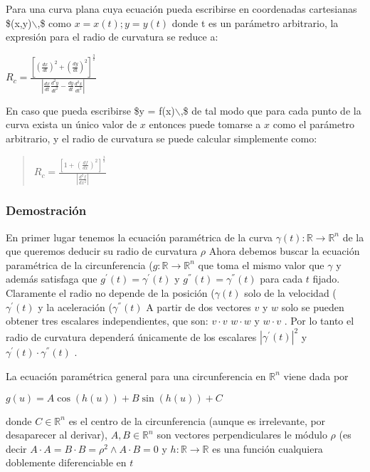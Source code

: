 \documentclass[11pt]{article}
\begin{document}
Para una curva plana cuya ecuación pueda escribirse en coordenadas
cartesianas
\$(x,y)$\backslash$,\$
como
\(x = x(t);y = y(t)\)
donde t es un parámetro arbitrario, la expresión para el radio de
curvatura se reduce a:

\(R_{c} = \frac{\left\lbrack {\left( \frac{dx}{dt} \right)^{2} + \left( \frac{dy}{dt} \right)^{2}} \right\rbrack^{\frac{3}{2}}}{\left| {\frac{dx}{dt}\frac{d^{2}y}{dt^{2}} - \frac{dy}{dt}\frac{d^{2}x}{dt^{2}}} \right|}\)

En caso que pueda escribirse
\$y = f(x)$\backslash$,\$
de tal modo que para cada punto de la curva exista un único valor de
\(x\)
entonces puede tomarse a
\(x\)
como el parámetro arbitrario, y el radio de curvatura se puede calcular
simplemente como:

\begin{quote}
\(R_{c} = \frac{\left\lbrack {1 + \left( \frac{df}{dx} \right)^{2}} \right\rbrack^{\frac{3}{2}}}{\left| \frac{d^{2}f}{dx^{2}} \right|}\)
\end{quote}

\subsubsection{Demostración}
\label{sec:org87e035a}

En primer lugar tenemos la ecuación paramétrica de la curva
\(\gamma(t):\mathbb{R}\rightarrow\mathbb{R}^{n}\)
de la que queremos deducir su radio de curvatura
\(\rho\)
Ahora debemos buscar la ecuación paramétrica de la circunferencia
(\(g:\mathbb{R}\rightarrow\mathbb{R}^{n}\)
que toma el mismo valor que
\(\gamma\)
y además satisfaga que
\(g^{\prime}(t) = \gamma^{\prime}(t)\)
y
\(g^{''}(t) = \gamma^{''}(t)\)
para cada
\(t\)
fijado. Claramente el radio no depende de la posición
(\(\gamma(t)\)
solo de la velocidad
(\(\gamma^{\prime}(t)\)
y la aceleración
(\(\gamma^{''}(t)\)
A partir de dos vectores
\(v\)
y
\(w\)
solo se pueden obtener tres escalares independientes, que son:
\(v \cdot v\)
\(w \cdot w\)
y
\(w \cdot v\)
. Por lo tanto el radio de curvatura dependerá únicamente de los
escalares
\(|\gamma^{\prime}(t)|^{2}\)
y
\(\gamma^{\prime}(t) \cdot \gamma^{''}(t)\)
.

La ecuación paramétrica general para una circunferencia en
\(\mathbb{R}^{n}\)
viene dada por

\(g(u) = A\cos\left( {h(u)} \right) + B\sin\left( {h(u)} \right) + C\)

donde
\(C \in \mathbb{R}^{n}\)
es el centro de la circunferencia (aunque es irrelevante, por
desaparecer al derivar),
\(A,B \in \mathbb{R}^{n}\)
son vectores perpendiculares le módulo
\(\rho\)
(es decir
\(A \cdot A = B \cdot B = \rho^{2} \land A \cdot B = 0\)
y
\(h:\mathbb{R}\rightarrow\mathbb{R}\)
es una función cualquiera doblemente diferenciable en
\(t\)
\end{document}

